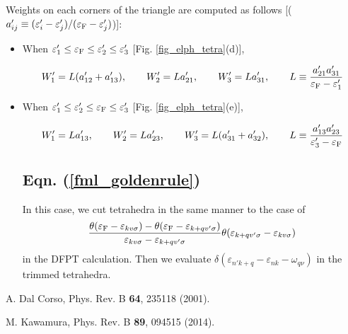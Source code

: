 \documentclass[12pt]{article}
\begin{document}
Weights on each corners of the triangle are computed as follows
[($a'_{i j} \equiv (\varepsilon'_i - \varepsilon'_j)/(\varepsilon_{\rm F} - \varepsilon'_j)$)]:

\begin{itemize}

\item When $\varepsilon'_1 \leq \varepsilon_{\rm F} \leq \varepsilon'_2 \leq \varepsilon'_3$
  [Fig. \ref{fig_elph_tetra}(d)], 

  \begin{align}
    W'_1 = L (a'_{1 2} + a'_{1 3}), \qquad
    W'_2 = L a'_{2 1}, \qquad
    W'_3 = L a'_{3 1}, \qquad
    L \equiv \frac{a'_{2 1} a'_{3 1}}{\varepsilon_{\rm F} - \varepsilon'_{1}}
  \end{align}

\item When $\varepsilon'_1 \leq \varepsilon'_2 \leq \varepsilon_{\rm F} \leq \varepsilon'_3$
  [Fig. \ref{fig_elph_tetra}(e)], 

  \begin{align}
    W'_1 = L a'_{1 3}, \qquad
    W'_2 = L a'_{2 3}, \qquad
    W'_3 = L (a'_{3 1} + a'_{3 2}), \qquad
    L \equiv \frac{a'_{1 3} a'_{2 3}}{\varepsilon'_{3} - \varepsilon_{\rm F}} 
  \end{align}

\subsection{Eqn. (\ref{fml_goldenrule})}

In this case, we cut tetrahedra in the same manner to the case of 
\begin{align}
    \frac{\theta(\varepsilon_{\rm F} - \varepsilon_{k v \sigma})
      - \theta(\varepsilon_{\rm F} - \varepsilon_{k+q v' \sigma})}
         {\varepsilon_{k v \sigma} - \varepsilon_{k+q v' \sigma}}
         \theta(\varepsilon_{k+q v' \sigma} - \varepsilon_{k v \sigma})
\end{align}
in the DFPT calculation.
Then we evaluate $\delta(\varepsilon_{n' k+q} - \varepsilon_{n k} - \omega_{q \nu})$
in the trimmed tetrahedra.

\end{itemize}

\begin{thebibliography}{99}
  
  A. Dal Corso, Phys. Rev. B {\bf 64}, 235118 (2001).

  M. Kawamura, Phys. Rev. B {\bf 89}, 094515 (2014).
  
\end{thebibliography}
\end{document}
